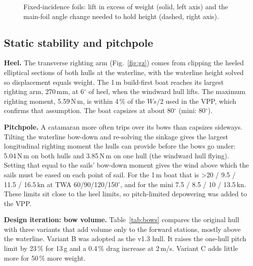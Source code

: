 \documentclass[10pt,twocolumn]{article}
\begin{document}
\begin{figure}[t]
\centering
{}
\caption{Fixed-incidence foils: lift in excess of weight (solid, left axis) and the main-foil angle change needed to hold height (dashed, right axis).}
\label{fig:heave}
\end{figure}

\subsection{Static stability and pitchpole}\label{sec:stab}
\textbf{Heel.} The transverse righting arm (Fig.~\ref{fig:gz}) comes from clipping the heeled elliptical sections of both hulls at the waterline, with the waterline height solved so displacement equals weight. The 1\,m build-first boat reaches its largest righting arm, 270\,mm, at 6$^\circ$ of heel, when the windward hull lifts. The maximum righting moment, 5.59\,N\,m, is within 4\,\% of the $Ws/2$ used in the VPP, which confirms that assumption. The boat capsizes at about 80$^\circ$ (mini: 80$^\circ$).

\noindent\textbf{Pitchpole.} A catamaran more often trips over its bows than capsizes sideways. Tilting the waterline bow-down and re-solving the sinkage gives the largest longitudinal righting moment the hulls can provide before the bows go under: 5.04\,N\,m on both hulls and 3.85\,N\,m on one hull (the windward hull flying). Setting that equal to the sails' bow-down moment gives the wind above which the sails must be eased on each point of sail. For the 1\,m boat that is >20 / 9.5 / 11.5 / 16.5\,kn at TWA 60/90/120/150$^\circ$, and for the mini 7.5 / 8.5 / 10 / 13.5\,kn. These limits sit close to the heel limits, so pitch-limited depowering was added to the VPP.

\noindent\textbf{Design iteration: bow volume.} Table~\ref{tab:bows} compares the original hull with three variants that add volume only to the forward stations, mostly above the waterline. Variant B was adopted as the v1.3 hull. It raises the one-hull pitch limit by 23\,\% for 13\,g and a 0.4\,\% drag increase at 2\,m/s. Variant C adds little more for 50\,\% more weight.
\end{document}
